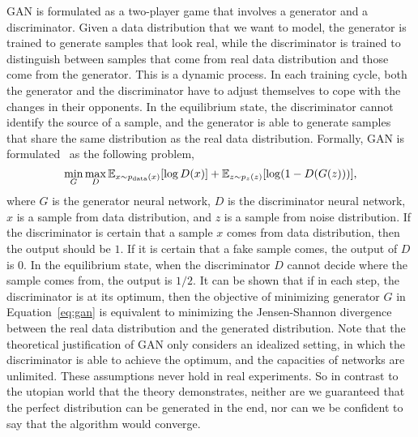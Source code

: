 GAN is formulated as a two-player game that involves a generator and
a discriminator.
Given a data distribution that we want to model,
the generator is trained to generate samples that look real,
while the discriminator is trained to distinguish between
samples that come from real data distribution and
those come from the generator.
This is a dynamic process.
In each training cycle,
both the generator and the discriminator have to adjust themselves
to cope with the changes in their opponents.
In the equilibrium state,
the discriminator cannot identify the source of a sample,
and the generator is able to generate samples that share the same
distribution as the real data distribution.
Formally,
GAN is formulated~\cite{goodfellow2014generative} as the following problem,
\begin{equation}\label{eq:gan}
    \min_G \max_D \mathbb{E}_{x\sim p_{\text{data}}(x)}[\log D(x)]
        + \mathbb{E}_{z\sim p_z(z)}[\log (1-D(G(z)))],
\end{equation}
where $G$ is the generator neural network,
$D$ is the discriminator neural network,
$x$ is a sample from data distribution,
and $z$ is a sample from noise distribution.
If the discriminator is certain that a sample $x$ comes from
data distribution,
then the output should be $1$.
If it is certain that a fake sample comes,
the output of $D$ is $0$.
In the equilibrium state,
when the discriminator $D$ cannot decide where the sample comes from,
the output is $1/2$.
It can be shown that if in each step,
the discriminator is at its optimum,
then the objective of minimizing generator $G$ in Equation~\eqref{eq:gan}
is equivalent to minimizing the Jensen-Shannon divergence between
the real data distribution and the generated distribution.
Note that the theoretical justification of GAN
only considers an idealized setting,
in which the discriminator is able to achieve the optimum,
and the capacities of networks are unlimited.
These assumptions never hold in real experiments.
So in contrast to the utopian world that the theory demonstrates,
neither are we guaranteed that the perfect distribution
can be generated in the end,
nor can we be confident to say that the algorithm would converge.

